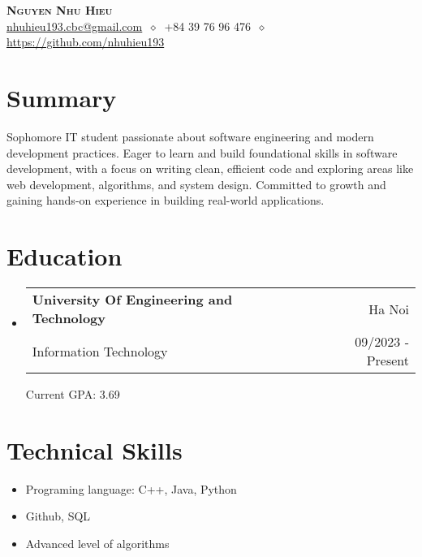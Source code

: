 \documentclass[letterpaper,11pt]{article}
\makeatletter
\newcommand{\cvitem}[1]{
  \item\small{
    {#1\vspace{-2pt}}
  }
}
\newcommand{\cvheading}[4]{
  \vspace{-2pt}\item
    \begin{tabular*}{\textwidth}[t]{l@{\extracolsep{\fill}}r}
      \textbf{#1} & #2 \\
      \small#3 & \small #4 \\
    \end{tabular*}\vspace{-7pt}
}
\newcommand{\cvheadingstart}{\begin{itemize}[leftmargin=0in, label={}]}
\newcommand{\cvheadingend}{\end{itemize}}
\newcommand{\cvitemstart}{\begin{itemize}\justifying}
\newcommand{\cvitemend}{\end{itemize}\vspace{-5pt}}
\makeatother
\begin{document}
\begin{center}
  \textbf{\LARGE\scshape Nguyen Nhu Hieu} \\
  \vspace{1pt}\small
  \href{mailto:}{nhuhieu193.cbc@gmail.com}
  $\ \diamond\ $ 
  +84 39 76 96 476
  $\ \diamond\ $
  \href{https://github.com/nhuhieu193}{https://github.com/nhuhieu193}
\end{center}




\section{Summary}
Sophomore IT student passionate about software engineering and modern development practices. Eager to learn and build foundational skills in software development, with a focus on writing clean, efficient code and exploring areas like web development, algorithms, and system design. Committed to growth and gaining hands-on experience in building real-world applications.

\section{Education}
\cvheadingstart
  \cvheading
    {University Of Engineering and Technology}{Ha Noi}
    {Information Technology}{09/2023 - Present}

    {Current GPA: 3.69}

\cvheadingend

\section{Technical Skills}
    \cvitemstart
        \cvitem {Programing language: C++, Java, Python}
        \cvitem {Github, SQL}
        \cvitem {Advanced level of algorithms}
    \cvitemend
\end{document}

